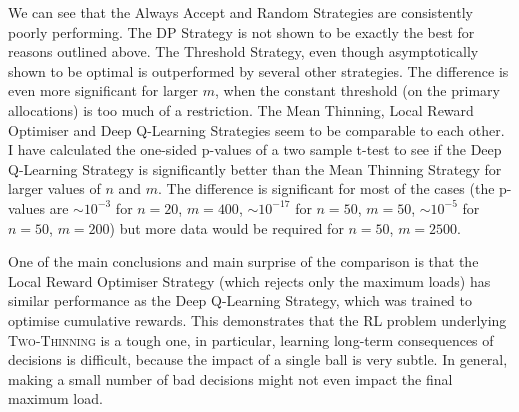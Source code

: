 We can see that the Always Accept and Random Strategies are consistently poorly performing. The DP Strategy is not shown to be exactly the best for reasons outlined above. The Threshold Strategy, even though asymptotically shown to be optimal is outperformed by several other strategies. The difference is even more significant for larger $m$, when the constant threshold (on the primary allocations) is too much of a restriction. The Mean Thinning, Local Reward Optimiser and Deep Q-Learning Strategies seem to be comparable to each other. I have calculated the one-sided p-values of a two sample t-test to see if the Deep Q-Learning Strategy is significantly better than the Mean Thinning Strategy for larger values of $n$ and $m$. The difference is significant for most of the cases (the p-values are $\sim 10^{-3}$ for $n=20$, $m=400$, $\sim 10^{-17}$ for $n=50$, $m=50$, $\sim 10^{-5}$ for $n=50$, $m=200$) but more data would be required for $n=50$, $m=2500$.  



One of the main conclusions and main surprise of the comparison is that the Local Reward Optimiser Strategy (which rejects only the maximum loads) has similar performance as the Deep Q-Learning Strategy, which was trained to optimise cumulative rewards. This demonstrates that the RL problem underlying \textsc{Two-Thinning} is a tough one, in particular, learning long-term consequences of decisions is difficult, because the impact of a single ball is very subtle. In general, making a small number of bad decisions might not even impact the final maximum load. 





